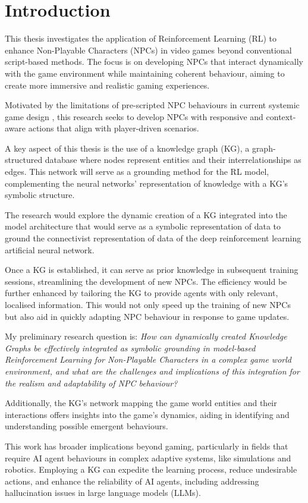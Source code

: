 \documentclass{article}
\begin{document}
\section{Introduction}
This thesis investigates the application of Reinforcement Learning (RL) to enhance Non-Playable Characters (NPCs) in video games beyond conventional script-based methods. The focus is on developing NPCs that interact dynamically with the game environment while maintaining coherent behaviour, aiming to create more immersive and realistic gaming experiences.

Motivated by the limitations of pre-scripted NPC behaviours in current systemic game design \cite{Systemic_Games}, this research seeks to develop NPCs with responsive and context-aware actions that align with player-driven scenarios.

A key aspect of this thesis is the use of a knowledge graph (KG), a graph-structured database where nodes represent entities and their interrelationships as edges. This network will serve as a grounding method for the RL model, complementing the neural networks' representation of knowledge with a KG's symbolic structure.

The research would explore the dynamic creation of a KG integrated into the model architecture that would serve as a symbolic representation of data to ground the connectivist representation of data of the deep reinforcement learning artificial neural network.

Once a KG is established, it can serve as prior knowledge in subsequent training sessions, streamlining the development of new NPCs. The efficiency would be further enhanced by tailoring the KG to provide agents with only relevant, localised information. This would not only speed up the training of new NPCs but also aid in quickly adapting NPC behaviour in response to game updates.

My preliminary research question is: \textit{How can dynamically created Knowledge Graphs be effectively integrated as symbolic grounding in model-based Reinforcement Learning for Non-Playable Characters in a complex game world environment, and what are the challenges and implications of this integration for the realism and adaptability of NPC behaviour?}

Additionally, the KG's network mapping the game world entities and their interactions offers insights into the game's dynamics, aiding in identifying and understanding possible emergent behaviours.

This work has broader implications beyond gaming, particularly in fields that require AI agent behaviours in complex adaptive systems, like simulations and robotics. Employing a KG can expedite the learning process, reduce undesirable actions, and enhance the reliability of AI agents, including addressing hallucination issues in large language models (LLMs).
\end{document}
